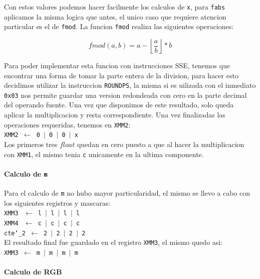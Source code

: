 Con estos valores podemos hacer facilmente los calculos de \texttt{x}, para \texttt{fabs} aplicamos la misma logica que antes, el unico caso que requiere atencion particular es el de \texttt{fmod}. La funcion \texttt{fmod} realiza las siguientes operaciones:

$$
fmod(a, b) = a - \left\lfloor\frac{a}{b}\right\rfloor * b 
$$

Para poder implementar esta funcion con instrucciones SSE, tenemos que encontrar una forma de tomar la parte entera de la division, para hacer esto decidimos utilizar la instruccion \texttt{ROUNDPS}, la misma si es uilizada con el inmediato \texttt{0x03} nos permite guardar una version redondeada con cero en la parte decimal del operando fuente. Una vez que disponimos de este resultado, solo queda aplicar la multiplicacion y resta correspondiente.
Una vez finalizadas las operaciones requeridas, tenemos en \texttt{XMM2}:\\

\noindent
\texttt{XMM2 $\gets$ 0 $\vert$ 0 $\vert$ 0 $\vert$ x}\\

Los primeros tres $float$ quedan en cero puesto a que al hacer la multiplicacion con \texttt{XMM1}, el mismo tenia \texttt{c} unicamente en la ultima componente.

\paragraph{Calculo de \texttt{m}\newline}

Para el calculo de \texttt{m} no hubo mayor particularidad, el mismo se llevo a cabo con los siguientes registros y mascaras:\\

\noindent
\texttt{XMM3 $\ \gets$ l $\vert$ l $\vert$ l $\vert$ l}\\
\texttt{XMM4 $\ \gets$ c $\vert$ c $\vert$ c $\vert$ c}\\
\texttt{cte\char`_2 $\gets$ 2 $\vert$ 2 $\vert$ 2 $\vert$ 2}\\

El resultado final fue guardado en el registro \texttt{XMM3}, el mismo quedo asi:\\

\noindent
\texttt{XMM3 $\gets$ m $\vert$ m $\vert$ m $\vert$ m}\\

\paragraph{Calculo de RGB\newline}

